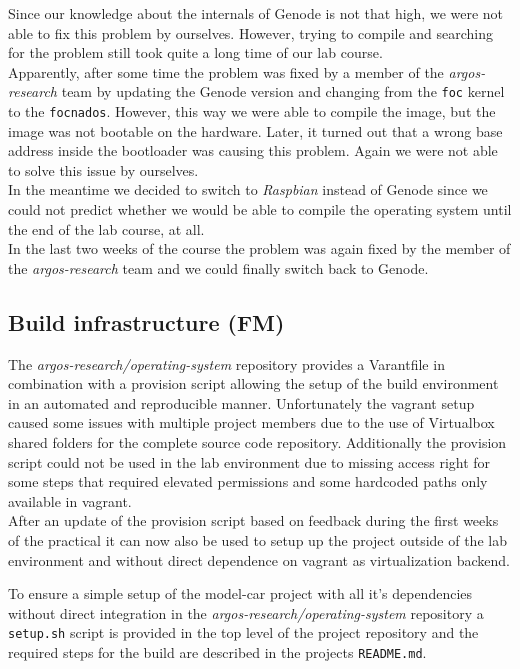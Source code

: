 Since our knowledge about the internals of Genode is not that high, we were not able to fix this problem by ourselves. However, trying to compile and searching for the problem still took quite a long time of our lab course. \\

Apparently, after some time the problem was fixed by a member of the \textit{argos-research} team by updating the Genode version and changing from the \texttt{foc} kernel to the \texttt{focnados}. However, this way we were able to compile the image, but the image was not bootable on the hardware. Later, it turned out that a wrong base address inside the bootloader was causing this problem. Again we were not able to solve this issue by ourselves. \\

In the meantime we decided to switch to \textit{Raspbian} instead of Genode since we could not predict whether we would be able to compile the operating system until the end of the lab course, at all. \\

In the last two weeks of the course the problem was again fixed by the member of the \textit{argos-research} team and we could finally switch back to Genode.


\subsection{Build infrastructure (FM)}
The \textit{argos-research/operating-system} repository provides a Varantfile in combination with a provision script allowing the setup of the build environment in an automated and reproducible manner.
Unfortunately the vagrant setup caused some issues with multiple project members due to the use of Virtualbox shared folders for the complete source code repository.
Additionally the provision script could not be used in the lab environment due to missing access right for some steps that required elevated permissions and some hardcoded paths only available in vagrant. \\

After an update of the provision script based on feedback during the first weeks of the practical it can now also be used to setup up the project outside of the lab environment and without direct dependence on vagrant as virtualization backend.

To ensure a simple setup of the model-car project with all it's dependencies without direct integration in the \textit{argos-research/operating-system} repository a \texttt{setup.sh} script is provided in the top level of the project repository and the required steps for the build are described in the projects \texttt{README.md}.
